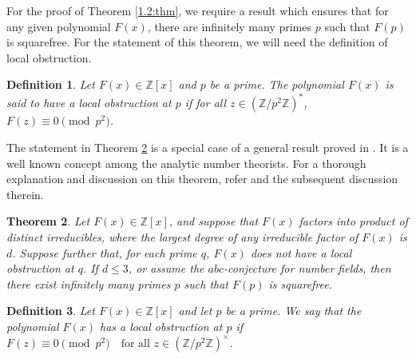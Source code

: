 \documentclass[table]{amsart}
\newtheorem{theorem}{Theorem}[section]
\newtheorem{definition}[theorem]{Definition}
\newcommand{\Z}{\mathbb{Z}}
\numberwithin{equation}{section}
\begin{document}
{\iffalse
For the proof of Theorem \ref{1.2:thm}, we require a result which ensures that for any given polynomial $F(x)$, there are infinitely many primes $p$ such that $F(p)$ is squarefree. For the statement of this theorem, we will need the definition of local obstruction.

\begin{definition}
    Let $F(x) \in \Z[x]$ and $p$ be a prime. The polynomial $F(x)$ is said to have a local obstruction at $p$ if for all $z \in (\Z/p^2\Z)^*$, $F(z) \equiv 0 \pmod{p^2}$.
\end{definition}

The statement in Theorem \ref{2.5:cor} is a special case of a general result proved in \cite[Theorem 1.1]{pasten}. It is a well known concept among the analytic number theorists. For a thorough explanation and discussion on this theorem, refer \cite[Remark 2.6]{jones & white} and the subsequent discussion therein.

\begin{theorem} \label{2.5:cor}
    Let $F(x) \in \Z[x]$, and suppose that $F(x)$ factors into product of distinct irreducibles, where the largest degree of any irreducible factor of $F(x)$ is $d$. Suppose further that, for each prime $q$, $F(x)$ does not have a local obstruction at $q$. If $d \leq 3$, or assume the $abc$-conjecture for number fields, then there exist infinitely many primes $p$ such that $F(p)$ is squarefree.
\end{theorem}


\begin{definition}
Let $F(x)\in \mathbb{Z}[x]$ and let $p$ be a prime.  
We say that the polynomial $F(x)$ has a \emph{local obstruction} at $p$ if $F(z) \equiv 0 \pmod{p^2}
\quad \text{for all } z \in (\mathbb{Z}/p^2\mathbb{Z})^{\times}.$
\end{definition}

}
\end{document}

